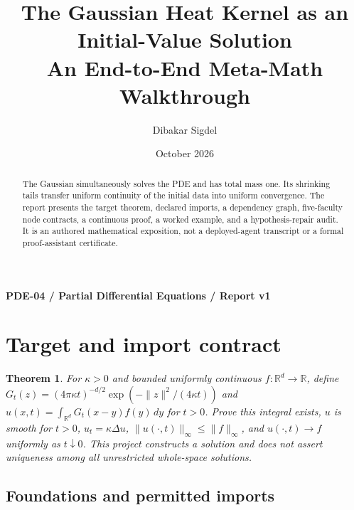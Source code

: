 \documentclass[preprint,12pt,aps,pra,showkeys,amsmath,amssymb,superscriptaddress,floatfix]{revtex4-2}
\newtheorem{theorem}{Theorem}[section]
\theoremstyle{definition}
\theoremstyle{remark}
\begin{document}
\title{The Gaussian Heat Kernel as an Initial-Value Solution\\[4pt]\large An End-to-End Meta-Math Walkthrough}

\author{Dibakar Sigdel}


\date{October 2026}

\begin{abstract}

The Gaussian simultaneously solves the PDE and has total mass one. Its
shrinking tails transfer uniform continuity of the initial data into
uniform convergence. The report presents the target theorem, declared
imports, a dependency graph, five-faculty node contracts, a continuous
proof, a worked example, and a hypothesis-repair audit. It is an
authored mathematical exposition, not a deployed-agent transcript or a
formal proof-assistant certificate.

\end{abstract}\maketitle\linespread{1.12}\selectfont

\noindent\textbf{PDE-04 / Partial Differential Equations / Report v1}

\section{Target and import contract}

\begin{theorem}

For \(\kappa>0\) and bounded uniformly continuous
\(f:\mathbb R^d\to\mathbb R\), define
\(G_t(z)=(4\pi\kappa t)^{-d/2}\exp(-\|z\|^2/(4\kappa t))\) and
\(u(x,t)=\int_{\mathbb R^d}G_t(x-y)f(y)\,dy\) for \(t>0\). Prove this
integral exists, \(u\) is smooth for \(t>0\), \(u_t=\kappa\Delta u\),
\(\|u(\cdot,t)\|_\infty\le\|f\|_\infty\), and \(u(\cdot,t)\to f\)
uniformly as \(t\downarrow0\). This project constructs a solution and
does not assert uniqueness among all unrestricted whole-space solutions.

\end{theorem}

\subsection{Foundations and permitted imports}
\end{document}
